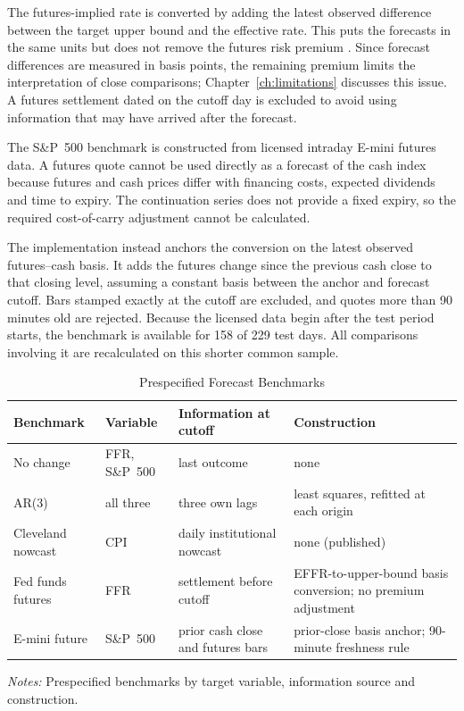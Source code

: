 \documentclass[12pt,a4paper]{report}
\newcommand{\tablenote}[1]{%
  \par\vspace{0.4em}%
  \begin{minipage}{0.9\textwidth}%
  \footnotesize\raggedright\emph{Notes:} #1%
  \end{minipage}%
}
\begin{document}
The futures-implied rate is converted by adding the latest observed difference
between the target upper bound and the effective rate. This puts the forecasts
in the same units but does not remove the futures risk premium
\parencite{piazzesi2008}. Since forecast differences are measured in basis
points, the remaining premium limits the interpretation of close comparisons;
Chapter~\ref{ch:limitations} discusses this issue. A futures settlement dated
on the cutoff day is excluded to avoid using information that may have arrived
after the forecast.

The S\&P~500 benchmark is constructed from licensed intraday E-mini futures
data. A futures quote cannot be used directly as a forecast of the cash index
because futures and cash prices differ with financing costs, expected dividends
and time to expiry. The continuation series does not provide a fixed expiry, so
the required cost-of-carry adjustment cannot be calculated.

The implementation instead anchors the conversion on the latest observed
futures--cash basis. It adds the futures change since the previous cash close to
that closing level, assuming a constant basis between the anchor and forecast
cutoff. Bars stamped exactly at the cutoff are excluded, and quotes more than
90 minutes old are rejected. Because the licensed data begin after the test
period starts, the benchmark is available for 158 of 229 test days. All
comparisons involving it are recalculated on this shorter common sample.

\begin{table}[htbp]
\centering
\caption{Prespecified Forecast Benchmarks}
\label{tab:benchmarks}
\small
\begin{tabular}{llp{3.2cm}p{4.1cm}}
\hline
Benchmark & Variable & Information at cutoff & Construction \\
\hline
No change & FFR, S\&P~500 & last outcome & none \\
AR(3) & all three & three own lags & least squares, refitted at each origin \\
Cleveland nowcast & CPI & daily institutional nowcast & none (published) \\
Fed funds futures & FFR & settlement before cutoff & EFFR-to-upper-bound basis conversion; no premium adjustment \\
E-mini future & S\&P~500 & prior cash close and futures bars & prior-close basis anchor; 90-minute freshness rule \\
\hline
\end{tabular}
\tablenote{Prespecified benchmarks by target variable, information source and
construction.}
\end{table}
\end{document}
